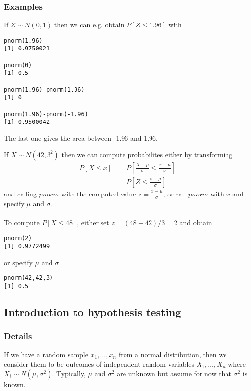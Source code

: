 \documentclass[12pt,a4paper]{article}
\theoremstyle{regla}
\theoremstyle{remark}
\theoremstyle{definition}
\theoremstyle{nonumberbreak}
\begin{document}
\subsubsection{Examples}
\begin{xmpl}
If $Z \sim N(0,1)$ then we can e.g. obtain $P[Z\leq1.96]$ with
\begin{lstlisting}
pnorm(1.96)
[1] 0.9750021

pnorm(0)
[1] 0.5

pnorm(1.96)-pnorm(1.96)
[1] 0

pnorm(1.96)-pnorm(-1.96)
[1] 0.9500042
\end{lstlisting}
The last one gives the area between -1.96 and 1.96.
\end{xmpl}
\begin{xmpl}
If $X \sim N(42,3^2)$ then we can compute probabilites either by transforming
\begin{align*}
P[X\leq x] &= P[\frac{X-\mu}{\sigma} \leq \frac{x-\mu}{\sigma}]\\
           &= P[Z \leq \frac{x-\mu}{\sigma}]
\end{align*}
and calling $pnorm$ with the computed value $z=\frac{x-\mu}{\sigma}$, or call $pnorm$ with $x$ and specify $\mu$ and $\sigma$.\\
\\
To compute $P[X\leq 48]$, either set $z=(48-42)/3=2$ and obtain
\begin{lstlisting}
pnorm(2)
[1] 0.9772499
\end{lstlisting}

or specify $\mu$ and $\sigma$

\begin{lstlisting}
pnorm(42,42,3)
[1] 0.5
\end{lstlisting}
\end{xmpl}



\subsection{Introduction to hypothesis testing}
\subsubsection{Details}
If we have a random sample $x_1, \ldots , x_n$ from a normal distribution, then we consider them to be outcomes of independent random variables $X_1, \ldots , X_n$ where $X_i \sim N(\mu, \sigma^2)$.
Typically, $\mu$ and $\sigma^2$ are unknown but assume for now that $\sigma^2$ is known.\\
\end{document}
